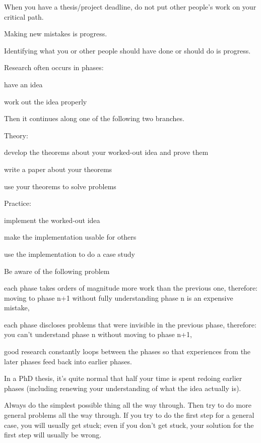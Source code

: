 \documentclass[12pt]{article}
\begin{document}
When you have a thesis/project deadline, do not put other people's work on your critical path.
\medskip

Making new mistakes is progress.
\medskip

Identifying what you or other people should have done or should do is progress.
\medskip

Research often occurs in phases:
\begin{compactenum}
\item have an idea
\item work out the idea properly
\end{compactenum}

Then it continues along one of the following two branches.

Theory:
\begin{compactenum}
\item develop the theorems about your worked-out idea and prove them
\item write a paper about your theorems
\item use your theorems to solve problems
\end{compactenum}

Practice:
\begin{compactenum}
\item implement the worked-out idea
\item make the implementation usable for others
\item use the implementation to do a case study
\end{compactenum}
\medskip

Be aware of the following problem
\begin{compactitem}
\item each phase takes orders of magnitude more work than the previous one,
  therefore: moving to phase n+1 without fully understanding phase n is an expensive mistake,
\item each phase discloses problems that were invisible in the previous phase,
  therefore: you can't understand phase n without moving to phase n+1,
\item good research constantly loops between the phases so that experiences from the later phases feed back into earlier phases.
\end{compactitem}
In a PhD thesis, it's quite normal that half your time is spent redoing earlier phases (including renewing your understanding of what the idea actually is).
\medskip

Always do the simplest possible thing all the way through.
Then try to do more general problems all the way through.
If you try to do the first step for a general case, you will usually get stuck; even if you don't get stuck, your solution for the first step will usually be wrong.
\end{document}
